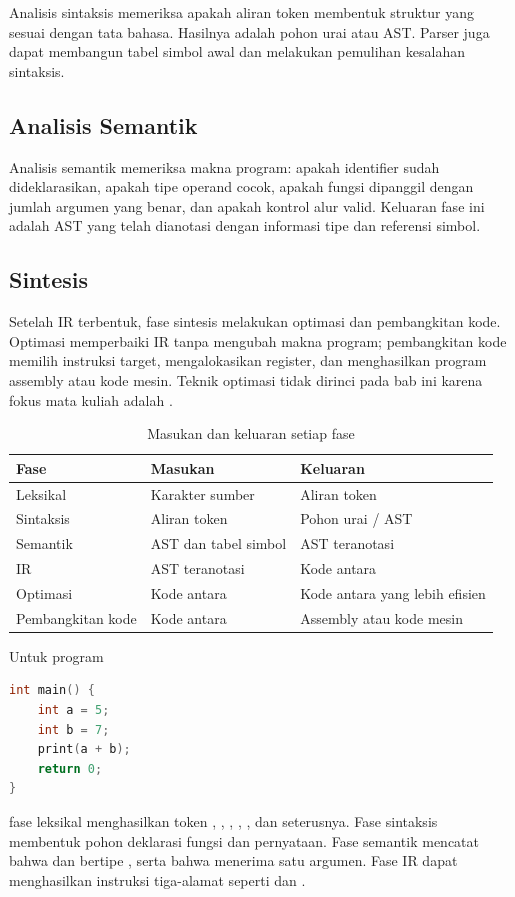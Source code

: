 Analisis sintaksis memeriksa apakah aliran token membentuk struktur
yang sesuai dengan tata bahasa. Hasilnya adalah pohon urai atau AST.
Parser juga dapat membangun tabel simbol awal dan melakukan pemulihan
kesalahan sintaksis.

\subsection{Analisis Semantik}

Analisis semantik memeriksa makna program: apakah identifier sudah
dideklarasikan, apakah tipe operand cocok, apakah fungsi dipanggil
dengan jumlah argumen yang benar, dan apakah kontrol alur valid.
Keluaran fase ini adalah AST yang telah dianotasi dengan informasi
tipe dan referensi simbol.

\subsection{Sintesis}

Setelah IR terbentuk, fase sintesis melakukan optimasi dan
pembangkitan kode. Optimasi memperbaiki IR tanpa mengubah makna
program; pembangkitan kode memilih instruksi target,
mengalokasikan register, dan menghasilkan program assembly atau
kode mesin. Teknik optimasi tidak dirinci pada bab ini karena fokus
mata kuliah adalah .

\begin{table}[H]
\centering
\caption{Masukan dan keluaran setiap fase}
\label{tab:ch03-fase}
\begin{tabularx}{\textwidth}{@{}lXX@{}}
\toprule
\textbf{Fase} & \textbf{Masukan} & \textbf{Keluaran} \\
\midrule
Leksikal & Karakter sumber & Aliran token \\
Sintaksis & Aliran token & Pohon urai / AST \\
Semantik & AST dan tabel simbol & AST teranotasi \\
IR & AST teranotasi & Kode antara \\
Optimasi & Kode antara & Kode antara yang lebih efisien \\
Pembangkitan kode & Kode antara & Assembly atau kode mesin \\
\bottomrule
\end{tabularx}
\end{table}

\begin{contoh}
Untuk program
\begin{lstlisting}[language=C]
int main() {
    int a = 5;
    int b = 7;
    print(a + b);
    return 0;
}
\end{lstlisting}
fase leksikal menghasilkan token , , \code{(},
\code{)}, \code{\{}, dan seterusnya. Fase sintaksis membentuk pohon
deklarasi fungsi dan pernyataan. Fase semantik mencatat bahwa
 dan  bertipe , serta bahwa 
menerima satu argumen. Fase IR dapat menghasilkan instruksi
tiga-alamat seperti  dan .
\end{contoh}
